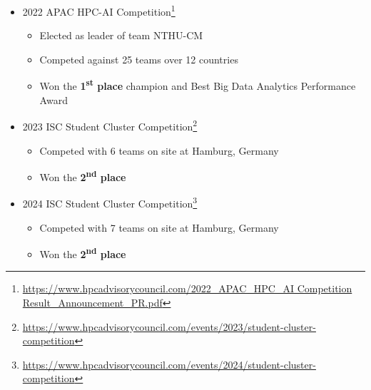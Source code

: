 \documentclass[12pt, a4paper]{article}
\begin{document}
\begin{itemize}
\item 2022 APAC HPC-AI Competition\footnote{\url{https://www.hpcadvisorycouncil.com/2022_APAC_HPC_AI Competition Result_Announcement_PR.pdf}}
\begin{itemize}
\item Elected as leader of team NTHU-CM
\item Competed against 25 teams over 12 countries
\item Won the \textbf{1\textsuperscript{st} place} champion and Best Big Data Analytics Performance Award
\end{itemize}
\item 2023 ISC Student Cluster Competition\footnote{\url{https://www.hpcadvisorycouncil.com/events/2023/student-cluster-competition}}
\begin{itemize}
\item Competed with 6 teams on site at Hamburg, Germany
\item Won the \textbf{2\textsuperscript{nd} place}
\end{itemize}
\item 2024 ISC Student Cluster Competition\footnote{\url{https://www.hpcadvisorycouncil.com/events/2024/student-cluster-competition}}
\begin{itemize}
\item Competed with 7 teams on site at Hamburg, Germany
\item Won the \textbf{2\textsuperscript{nd} place}
\end{itemize}
\end{itemize}
\end{document}
